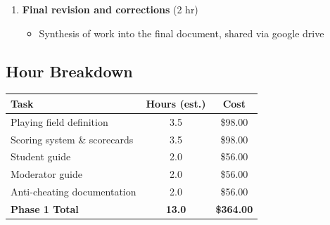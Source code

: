 \documentclass[a4]{article}
\begin{document}
\begin{enumerate}[leftmargin=*]
        \item \textbf{Final revision and corrections} (2 hr)
    \begin{itemize}
        \item Synthesis of work into the final document, shared via google drive
    \end{itemize}
\end{enumerate}

\subsection*{Hour Breakdown}

\begin{center}
\begin{tabular}{lcc}
\toprule
\textbf{Task} & \textbf{Hours (est.)} & \textbf{Cost} \\
\midrule
Playing field definition & 3.5 & \$98.00 \\
Scoring system \& scorecards & 3.5 & \$98.00 \\
Student guide & 2.0 & \$56.00 \\
Moderator guide & 2.0 & \$56.00 \\
Anti-cheating documentation & 2.0 & \$56.00 \\
\midrule
\textbf{Phase 1 Total} & \textbf{13.0} & \textbf{\$364.00} \\
\bottomrule
\end{tabular}
\end{center}
\end{document}
